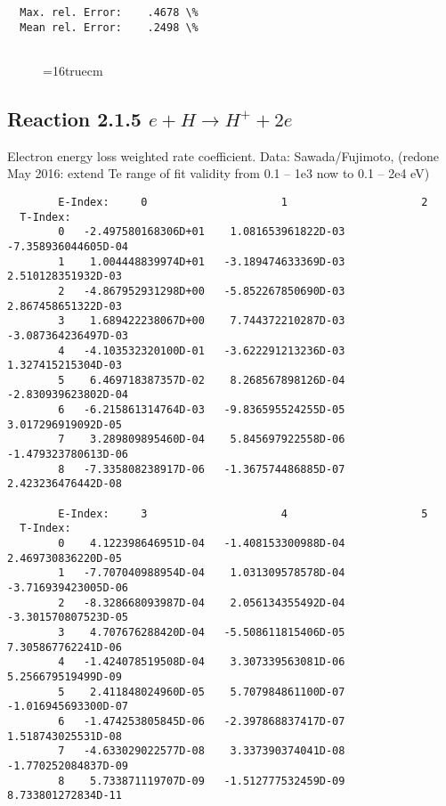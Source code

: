 \documentclass[12pt,dvipdfmx]{article}
\begin{document}
{\begin{small}
\begin{verbatim}
  Max. rel. Error:    .4678 \%
  Mean rel. Error:    .2498 \%


\end{verbatim}\end{small}
\begin{figure} \label{2.1.5i}
\epsfxsize=16truecm
\end{figure}
\newpage

\subsection{
Reaction 2.1.5  $ e + H \rightarrow H^+ + 2e $
}
Electron energy loss weighted rate coefficient. Data: Sawada/Fujimoto, \cite{kn:Sawada}
(redone May 2016: extend Te range of fit validity from 0.1 -- 1e3 now to 0.1 -- 2e4 eV)

\begin{small}\begin{verbatim}
        E-Index:     0                     1                     2
  T-Index:
        0   -2.497580168306D+01    1.081653961822D-03   -7.358936044605D-04
        1    1.004448839974D+01   -3.189474633369D-03    2.510128351932D-03
        2   -4.867952931298D+00   -5.852267850690D-03    2.867458651322D-03
        3    1.689422238067D+00    7.744372210287D-03   -3.087364236497D-03
        4   -4.103532320100D-01   -3.622291213236D-03    1.327415215304D-03
        5    6.469718387357D-02    8.268567898126D-04   -2.830939623802D-04
        6   -6.215861314764D-03   -9.836595524255D-05    3.017296919092D-05
        7    3.289809895460D-04    5.845697922558D-06   -1.479323780613D-06
        8   -7.335808238917D-06   -1.367574486885D-07    2.423236476442D-08

        E-Index:     3                     4                     5
  T-Index:
        0    4.122398646951D-04   -1.408153300988D-04    2.469730836220D-05
        1   -7.707040988954D-04    1.031309578578D-04   -3.716939423005D-06
        2   -8.328668093987D-04    2.056134355492D-04   -3.301570807523D-05
        3    4.707676288420D-04   -5.508611815406D-05    7.305867762241D-06
        4   -1.424078519508D-04    3.307339563081D-06    5.256679519499D-09
        5    2.411848024960D-05    5.707984861100D-07   -1.016945693300D-07
        6   -1.474253805845D-06   -2.397868837417D-07    1.518743025531D-08
        7   -4.633029022577D-08    3.337390374041D-08   -1.770252084837D-09
        8    5.733871119707D-09   -1.512777532459D-09    8.733801272834D-11


\end{verbatim}
\end{small}}
\end{document}
